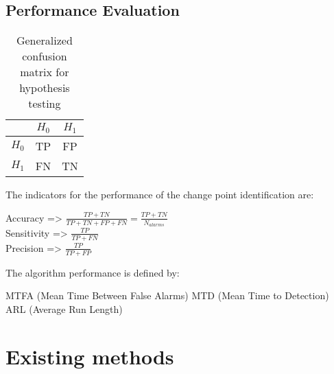 

\subsection {Performance Evaluation} \label{subsec:performance_evaluation}

\begin{table}[h]
\centering
\label{tab:confusion_matrix}
\begin{tabular}{c|c|c}
    
          & $H_0$  &  $H_1$   \\   \hline
    $H_0$ & TP     &  FP      \\   \hline
    $H_1$ & FN     &  TN      \\   
\end{tabular}
\caption{Generalized confusion matrix for hypothesis testing}
\end{table}

The indicators for the performance of the change point identification are:

Accuracy => $ \frac {TP + TN} {TP + TN + FP + FN} = \frac {TP + TN} {N_{alarms}}  $ \\
Sensitivity => $ \frac {TP} {TP + FN}$ \\
Precision => $ \frac {TP} {TP + FP}$

The algorithm performance is defined by:

MTFA (Mean Time Between False Alarms)
MTD (Mean Time to Detection)
ARL (Average Run Length)

\section {Existing methods}

